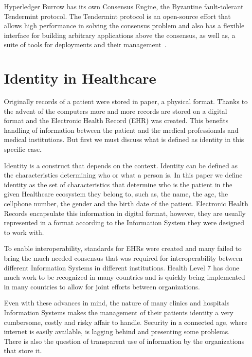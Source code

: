 Hyperledger Burrow has its own Consensus Engine, the Byzantine fault-tolerant
Tendermint protocol.  The Tendermint protocol is an open-source effort that
allows high performance in solving the consensus problem and also has a
flexible interface for building arbitrary applications above the consensus, as
well as, a suite of tools for deployments and their
management~\cite{Buchman2016}.

\section{Identity in Healthcare}

Originally records of a patient were stored in paper, a physical format.
Thanks to the advent of the computers more and more records are stored on a
digital format and the Electronic Health Record (EHR) was created.
\cite{Marquez2017}  This benefits handling of information between the patient
and the medical professionals and medical institutions.\cite{ONCoordinator2017}
But first we must discuss what is defined as identity in this specific case.

Identity is a construct that depends on the context.  Identity can be defined
as the characteristics determining who or what a person is.  In this paper we
define identity as the set of characteristics that determine who is the patient
in the given Healthcare ecosystem they belong to, such as, the name, the age,
the cellphone number, the gender and the birth date of the patient.  Electronic
Health Records encapsulate this information in digital format, however, they
are usually represented in a format according to the Information System they
were designed to work with.

To enable interoperability, standards for EHRs were created and many failed to
bring the much needed consensus that was required for interoperability between
different Information Systems in different institutions.  \cite{Eichelberg2006}
Health Level 7 has done much work to be recognized in many countries and is
quickly being implemented in many countries to allow for joint efforts between
organizations. \cite{HL7Anual2016}

Even with these advances in mind, the nature of many clinics and hospitals
Information Systems makes the management of their patients identity a very
cumbersome, costly and risky affair to handle.  Security in a connected age,
where internet is easily available, is lagging behind and presenting some
problems.  There is also the question of transparent use of information by the
organizations that store it.